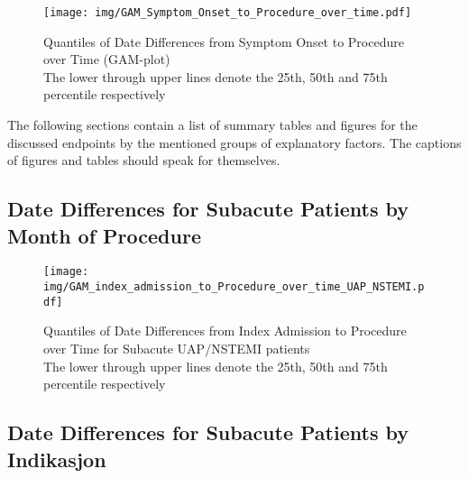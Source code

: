 \documentclass[a4paper]{report}
\begin{document}
\begin{itemize}
{\begin{figure}
  \centering
  \caption{Quantiles of Date Differences from Symptom Onset to Procedure over Time (GAM-plot)\\
  The lower through upper lines denote the 25th, 50th and 75th percentile respectively}
  \label{GAM: Date Differences from Symptom Onset to Procedure over Time}
\texttt{[image: img/GAM\_Symptom\_Onset\_to\_Procedure\_over\_time.pdf]}\end{figure}



The following sections contain a list of summary tables and figures for the discussed endpoints by the mentioned groups of explanatory factors. The captions of figures and tables should speak for themselves.








\clearpage
\subsection{Date Differences for Subacute Patients by Month of Procedure}

\begin{figure}
  \centering
  \caption{Quantiles of Date Differences from Index Admission to Procedure over Time for Subacute UAP/NSTEMI patients\\
  The lower through upper lines denote the 25th, 50th and 75th percentile respectively}
  \label{GAM: Date Differences from Index Admission to Procedure over Time UAP+NSTEMI}
\texttt{[image: img/GAM\_index\_admission\_to\_Procedure\_over\_time\_UAP\_NSTEMI.pdf]}\end{figure}





\clearpage
\subsection{Date Differences for Subacute Patients by Indikasjon}

}
\end{itemize}
\end{document}
